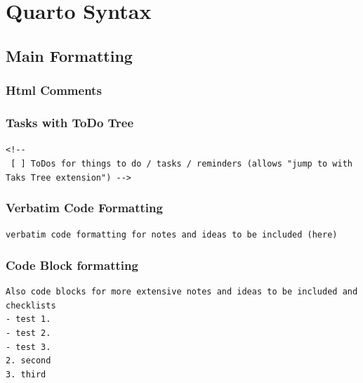 \documentclass[
  11pt,
  letterpaper,
]{book}
\begin{document}


\chapter*{Quarto Syntax}\label{sec-syntax}


\section*{Main Formatting}\label{main-formatting}


\subsection*{Html Comments}\label{html-comments}

\subsection*{Tasks with ToDo Tree}\label{tasks-with-todo-tree}

\texttt{\textless{}!-\/-\ {[}\ {]}\ ToDos\ for\ things\ to\ do\ /\ tasks\ /\ reminders\ (allows\ "jump\ to\ with\ Taks\ Tree\ extension")\ -\/-\textgreater{}}

\subsection*{Verbatim Code Formatting}\label{verbatim-code-formatting}

\texttt{verbatim\ code\ formatting\ for\ notes\ and\ ideas\ to\ be\ included\ (here)}

\subsection*{Code Block formatting}\label{code-block-formatting}

\begin{verbatim}
Also code blocks for more extensive notes and ideas to be included and checklists
- test 1. 
- test 2. 
- test 3.
2. second
3. third
\end{verbatim}
\end{document}
